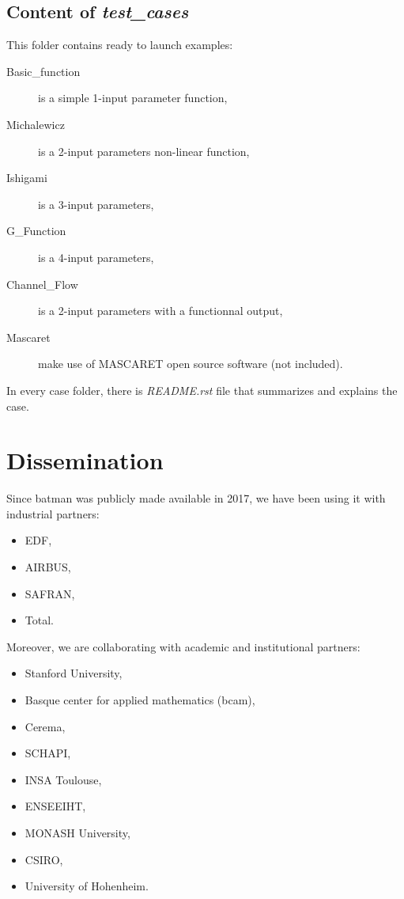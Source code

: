 \subsection{Content of \emph{test\_cases}}

This folder contains ready to launch examples: 

\begin{description}
\item[Basic\_function] is a simple 1-input parameter function,
\item[Michalewicz] is a 2-input parameters non-linear function,
\item[Ishigami] is a 3-input parameters,
\item[G\_Function] is a 4-input parameters,
\item[Channel\_Flow] is a 2-input parameters with a functionnal output,
\item[Mascaret] make use of MASCARET open source software (not included).
\end{description}

In every case folder, there is \emph{README.rst} file that summarizes and explains the case.

\section{Dissemination}

Since batman was publicly made available in 2017, we have been using it with industrial partners:

\begin{itemize}
\item EDF,
\item AIRBUS,
\item SAFRAN,
\item Total.
\end{itemize}

Moreover, we are collaborating with academic and institutional partners:

\begin{itemize}
\item Stanford University,
\item Basque center for applied mathematics (bcam),
\item Cerema,
\item SCHAPI,
\item INSA Toulouse,
\item ENSEEIHT,
\item MONASH University,
\item CSIRO,
\item University of Hohenheim.
\end{itemize}

